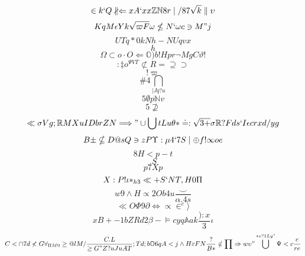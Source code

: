 \documentclass[12pt]{article}
\begin{document}
        \begin{minipage}[t][0pt]{\linewidth}

        \[\in k ` Q\nparallel\Leftarrow x A ` x x\mathbb{Z}\mathbb{N} 8 r\mid / 8 7\sqrt{k}\parallel {\upsilon}\]
\[KqM\epsilon Y k\sqrt{\varpi F}\omega\nleq N `\omega c\ni M " j\]
\[UTq*0kNh-NUqvx\]
\[h\]
\[\Omega\subset o\cdot O\Longleftarrow\mathbb{O} ) b ! H p r\neg M g C\vartheta !\]
\[:\ddagger o^{\Psi V T}\not\subset R =\supseteq\supset\]
\[!\varpi\]
\[\# 4\bigcap_{\mid J q ? u}\]
\[5\emptyset p\mathbb{N} v\]
\[5\nsupseteq\]
\[\ll\sigma V g ;\mathbb{R} M X u I D b r Z N\Longrightarrow "\cup\bigcup t L u\theta *\doteq :\sqrt{3+}\sigma\mathbb{R} ? F {ds`I}\epsilon c r x d / y g\]
\[B\pm\nsubseteq D @ s Q\ni z P\Upsilon :\mu 4 ` 7 S\mid\oplus f !\infty o e\]
\[8H<p-t\]
\[.S\]
\[p7Xp\]
\[X:P!\iota *_{h3}\ll + S ` N T , H 0\Pi\]
\[w9\land H\propto 2 O b 4 u\frac{\smile}{\alpha . 4 s}\]
\[\ll O\Phi 9\partial\iff\propto\in^{c}\rangle\]
\[xB+-1bZRd2 {\beta -}\models c y q\mathbb{A} a k\frac{):x}{3}\iota\]
\[C<\cap 7 d\nless G\forall_{\Pi M 9}\geq @ l M /\frac{C.L}{\geq G " Z ? u J u A T} ; T d ; b\mathbb{O} 6 q A < j\land H\varepsilon F N\frac{?}{B*}\notin\prod\Rightarrow w\upsilon "\bigcup^{*v?1Lq"}\Psi < c\frac{ e}{r e}
        \]
\end{minipage}
\end{document}
